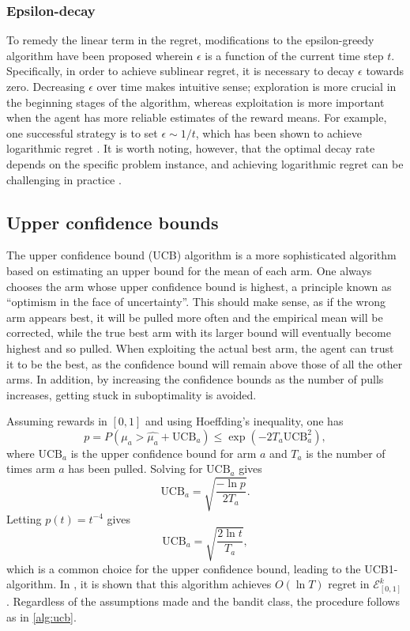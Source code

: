 \subsubsection{Epsilon-decay}
To remedy the linear term in the regret, modifications to the epsilon-greedy algorithm have been proposed wherein $\epsilon$ is a function of the current time step $t$.
Specifically, in order to achieve sublinear regret, it is necessary to decay $\epsilon$ towards zero.
Decreasing $\epsilon$ over time makes intuitive sense; exploration is more crucial in the beginning stages of the algorithm, whereas exploitation is more important when the agent has more reliable estimates of the reward means.
For example, one successful strategy is to set $\epsilon \sim 1/t$, which has been shown to achieve logarithmic regret \autocite{auer2002}.
It is worth noting, however, that the optimal decay rate depends on the specific problem instance, and achieving logarithmic regret can be challenging in practice \autocite{bubeck2012}.


\subsection{Upper confidence bounds}
The upper confidence bound (UCB) algorithm is a more sophisticated algorithm based on estimating an upper bound for the mean of each arm.
One always chooses the arm whose upper confidence bound is highest, a principle known as \enquote{optimism in the face of uncertainty}.
This should make sense, as if the wrong arm appears best, it will be pulled more often and the empirical mean will be corrected, while the true best arm with its larger bound will eventually become highest and so pulled.
When exploiting the actual best arm, the agent can trust it to be the best, as the confidence bound will remain above those of all the other arms.
In addition, by increasing the confidence bounds as the number of pulls increases, getting stuck in suboptimality is avoided.

Assuming rewards in $[0,1]$ and using Hoeffding's inequality, one has
\begin{equation}
    p
    = P \left(\mu_a > \hat{\mu_a} + \text{UCB}_a \right)
    \leq \exp \left(-2T_a \text{UCB}_a^2 \right),
\end{equation}
where $\text{UCB}_a$ is the upper confidence bound for arm $a$ and $T_a$ is the number of times arm $a$ has been pulled.
Solving for $\text{UCB}_a$ gives
\begin{equation}
    \text{UCB}_a = \sqrt{\frac{-\ln p}{2T_a}}.
\end{equation}
Letting $p(t) = t^{-4}$ gives
\begin{equation}
    \text{UCB}_a = \sqrt{\frac{2 \ln t}{T_a}},
\end{equation}
which is a common choice for the upper confidence bound, leading to the UCB1-algorithm.
In \autocite{auer2002}, it is shown that this algorithm achieves $O(\ln T)$ regret in $\mathcal{E}_{[0,1]}^k$.
Regardless of the assumptions made and the bandit class, the procedure follows as in \cref{alg:ucb}.

